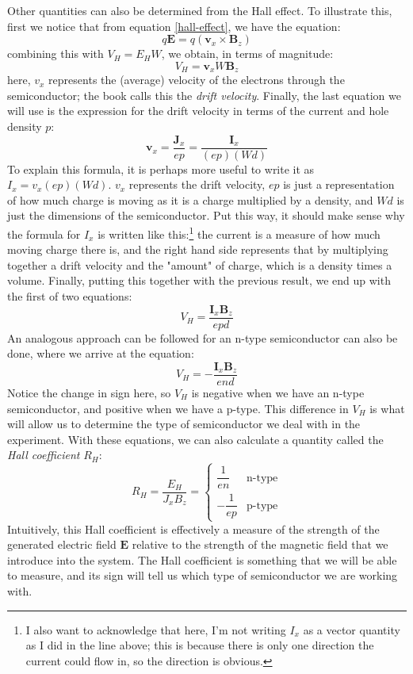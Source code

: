 \documentclass[10pt]{article}
\begin{document}
	Other quantities can also be determined from the Hall effect. To illustrate this, first we notice that
	from equation \ref{hall-effect}, we have the equation:
	\[
		q \mathbf{E} = q (\mathbf{v}_x \times \mathbf{B}_z)
	\]
	combining this with \( V_H = E_H W \), we obtain, in terms of magnitude:
	\[
		V_H = \mathbf{v}_x W \mathbf{B}_z
	\]
	here, \( v_x  \) represents the (average) velocity of the electrons through the semiconductor; the book calls this
	the \textit{drift velocity}. Finally, the last equation we will use is the expression for the drift
	velocity in terms of the current and hole density \( p \):
	\[
		\mathbf{v}_x = \frac{\mathbf{J}_x}{ep} = \frac{\mathbf{I}_x}{(ep)(Wd)}
	\]
	To explain this formula, it is perhaps more useful to write it as \( I_x = v_x (ep)(Wd) \). \( v_x \)
	represents the drift velocity, \( ep \) is just a representation of how much charge is moving as it is a
	charge multiplied by a density, and \( Wd \) is just the dimensions of the semiconductor. Put this way,
	it should make sense why the formula for \( I_x \) is written like this:\footnote{I also want to
		acknowledge that here, I'm not writing \( I_x \) as a vector quantity as I did in the line above;
	this is because there is only one direction the current could flow in, so the direction is obvious.} 
	the current is a measure
	of how much moving charge there is, and the right hand side represents that by multiplying together a
	drift velocity and the "amount" of charge, which is a density times a volume. Finally, putting
	this together with the previous result, we end up with the first of two equations:
	\begin{equation}
		\label{vh-pos}
		V_H = \frac{\mathbf{I}_x \mathbf{B}_z}{epd}
	\end{equation}
	An analogous approach can be followed for an n-type semiconductor can also be done, where we arrive at
	the equation:
	\begin{equation}
		\label{vh-neg}
		V_H = -\frac{\mathbf{I}_x \mathbf{B}_z}{end}
	\end{equation}
	Notice the change in sign here, so \( V_H \) is negative when we have an n-type semiconductor, and
	positive when we have a p-type. This difference in \( V_H \) is what will allow us to determine the type
	of semiconductor we deal with in the experiment. With these equations, we can also calculate a quantity
	called the \textit{Hall coefficient} \( R_H \):
	\begin{equation}
		\label{rh}
		R_H = \frac{E_H}{J_x B_z} = \begin{cases}
			\dfrac{1}{en} & \text{n-type}\\
			-\dfrac{1}{ep} & \text{p-type}
		\end{cases}
	\end{equation}
	Intuitively, this Hall coefficient is effectively a measure of the strength of the generated electric
	field \( \mathbf{E} \) relative to the strength of the magnetic field that we introduce into the system.
	The Hall coefficient is something that we will be able to measure, and its sign will tell us which type
	of semiconductor we are working with. 
\end{document}
